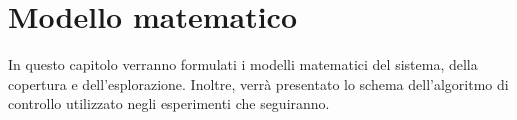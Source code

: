\chapter{Modello matematico} \label{ch:modello} %
In questo capitolo verranno formulati i modelli matematici del sistema, della copertura e dell'esplorazione. Inoltre, verrà presentato lo schema dell'algoritmo di controllo utilizzato negli esperimenti che seguiranno.
